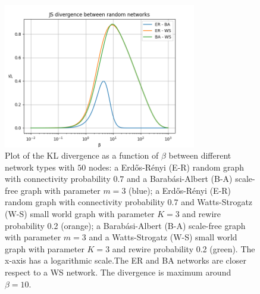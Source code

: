 \begin{figure}[ht!]
    \centering
    \includegraphics[width=0.75\textwidth]{image/JS_divergence.png}
    \caption{Plot of the KL divergence as a function of $\beta$ between different network types with $50$ nodes: a Erd\H{o}s-Rényi (E-R) random graph with connectivity probability $0.7$ and a Barab\'asi-Albert (B-A) scale-free graph with parameter $m=3$ (blue); a Erd\H{o}s-Rényi (E-R) random graph with connectivity probability $0.7$ and Watts-Strogatz (W-S) small world graph with parameter $K=3$ and rewire probability 0.2 (orange); a Barab\'asi-Albert (B-A) scale-free graph with parameter $m=3$ and a Watts-Strogatz (W-S) small world graph with parameter $K=3$ and rewire probability 0.2 (green). The x-axis has a logarithmic scale.The ER and BA networks are closer respect to a WS network. The divergence is maximum around $\beta = 10$.}
    \label{Fig:JS_divergence}
\end{figure}